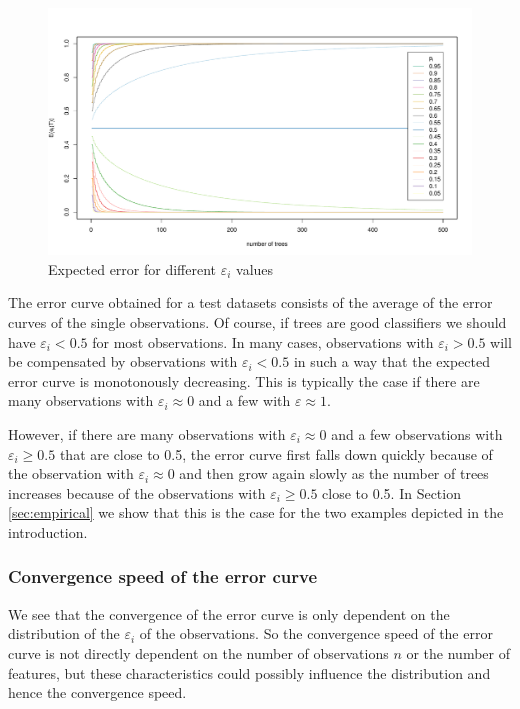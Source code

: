 \documentclass[paper=a4
               ,12pt
               ,DIV=12
               ,parskip=half
               ,titlepage=on
               ,headinclude 
               ,footinclude
               ,headsepline
               ,footsepline         %
               ,ilines 
               ]{scrartcl}
\begin{document}
\begin{figure}[!htb]
\begin{center}
  \includegraphics[width=\textwidth]{error_curves.pdf}
  \caption{Expected error for different $\varepsilon_i$ values}
  \label{fig:errorcurves}
\end{center}
\end{figure}

The error curve obtained for a test datasets consists of the average of the error curves of the single observations. Of course, if trees are good classifiers we should have $\varepsilon_i < 0.5$ for most observations. In many cases, observations with  $\varepsilon_i > 0.5$ will be compensated by observations with $\varepsilon_i < 0.5$ in such a way that the expected error curve is monotonously decreasing. This is typically the case if there are many observations with $\varepsilon_i\approx 0$ and a few with $\varepsilon\approx 1$.

However, if there are many observations with  $\varepsilon_i\approx 0$ and a few  observations with $\varepsilon_i \geq 0.5$ that are close to 0.5, the error curve first
falls down quickly because of the observation with $\varepsilon_i \approx 0$ and then grow again slowly as the number of trees increases because of the observations with $\varepsilon_i \geq 0.5$ close to 0.5. In Section \ref{sec:empirical}
we show that this is the case for the two examples depicted in the introduction. 

\subsubsection{Convergence speed of the error curve}
We see that the convergence of the error curve is only dependent on the distribution of the $\varepsilon_i$ of the observations. So the convergence speed of the error curve is not directly dependent 
on the number of observations $n$ or the number of features, but these characteristics could possibly influence the distribution and hence the convergence speed.  
\end{document}

